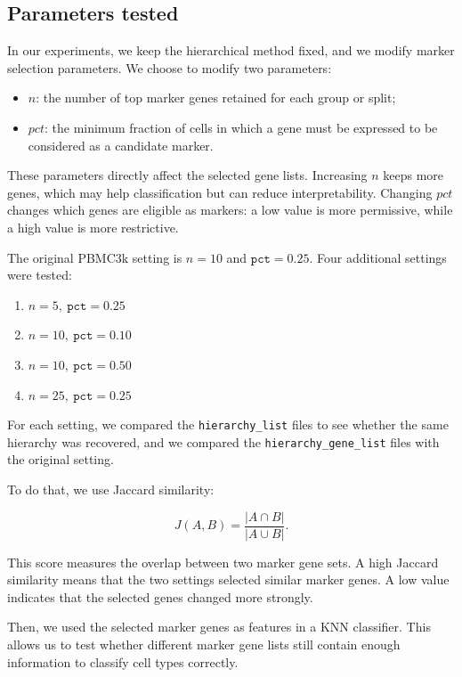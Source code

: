 \documentclass[11pt,a4paper]{article}
\begin{document}
\subsection{Parameters tested}

In our experiments, we keep the hierarchical method fixed, and we modify marker selection parameters.
We choose to modify two parameters:

\begin{itemize}[leftmargin=1.5em]
    \item $n$: the number of top marker genes retained for each group or split;
    \item $pct$: the minimum fraction of cells in which a gene must be expressed to be considered as a candidate marker.
\end{itemize}

These parameters directly affect the selected gene lists.
Increasing $n$ keeps more genes, which may help classification but can reduce interpretability.
Changing $pct$ changes which genes are eligible as markers: a low value is more permissive, while a high value is more restrictive.

The original PBMC3k setting is $n=10$ and $\texttt{pct}=0.25$.
Four additional settings were tested:
\begin{enumerate}
    \item $n=5,\ \texttt{pct}=0.25$
    \item $n=10,\ \texttt{pct}=0.10$
    \item $n=10,\ \texttt{pct}=0.50$
    \item $n=25,\ \texttt{pct}=0.25$
\end{enumerate}

For each setting, we compared the \texttt{hierarchy\_list} files to see whether the same hierarchy was recovered, and we compared the \texttt{hierarchy\_gene\_list} files with the original setting. 

To do that, we use Jaccard similarity:

\[
J(A,B) = \frac{|A \cap B|}{|A \cup B|}.
\]

This score measures the overlap between two marker gene sets.
A high Jaccard similarity means that the two settings selected similar marker genes.
A low value indicates that the selected genes changed more strongly. 

Then, we used the selected marker genes as features in a KNN classifier.
This allows us to test whether different marker gene lists still contain enough information to classify cell types correctly.
\end{document}
